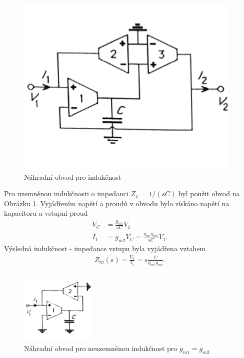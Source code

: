 \begin{figure}[h]
\centering
\includegraphics[scale=0.55]{image13.png}
\caption[Náhradní obvod pro indukčnost]{Náhradní obvod pro indukčnost \cite{12} \label{s:IND}}
\end{figure}
\noindent Pro uzemněnou indukčnosti o impedanci $Z_L = 1/(sC)$ byl použit obvod na Obrázku \ref{s:IND}. Vyjádřením napětí a proudů v obvodu bylo získáno napětí na kapacitoru a vstupní proud
\begin{align}
V_C &= \frac{g_{m1}}{sC}V_1 \\
I_1 &= g_{m2}V_C = \frac{g_{m1}g_{m2}}{sC}V_1.
\end{align}
Výsledná indukčnost - impedance vstupu byla vyjádřena vztahem
\begin{align}
Z_{in}(s) = \frac{V_1}{I_1} = s\frac{C}{g_{m1}g_{m2}}.
\end{align}
\begin{figure}[h]
\centering
\includegraphics[scale=1]{image12.png}
\caption[Náhradní obvod pro neuzemněnou indukčnost]{Náhradní obvod pro neuzemněnou indukčnost pro $g_{m1} = g_{m2}$\cite{12}}
\end{figure}

